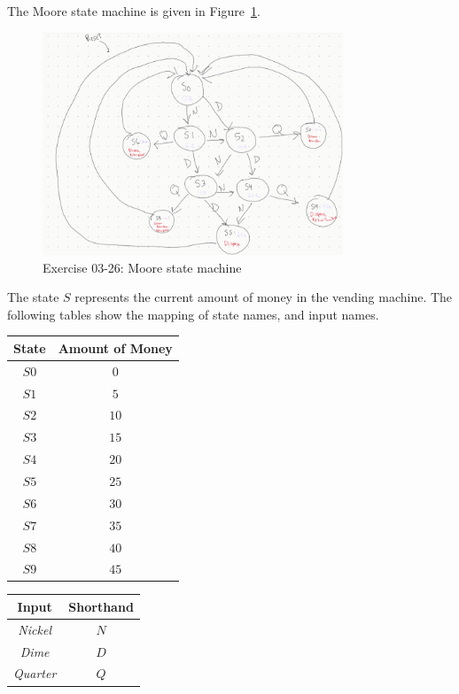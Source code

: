 \documentclass[12pt]{article}
\newenvironment{sol}[1][Solution]{\begin{trivlist}
		\item[\hskip \labelsep {\bfseries #1:}]}{\end{trivlist}}
\begin{document}
\begin{sol}
	The Moore state machine is given in Figure~\ref{03-26-state-machine}.
	\begin{figure}
		\centering
		\includegraphics[width=0.8\textwidth]{03-26-state-machine}
		\caption{Exercise 03-26: Moore state machine}
		\label{03-26-state-machine}
	\end{figure}
	The state $S$ represents the current amount of money in the vending machine.
	The following tables show the mapping of state names, and input names.
	\begin{center}
		\begin{tabular}{c|c}
			State & Amount of Money\\
			\hline
			$S0$ & $0$ \textcent\\
			$S1$ & $5$ \textcent\\
			$S2$ & $10$ \textcent\\
			$S3$ & $15$ \textcent\\
			$S4$ & $20$ \textcent\\
			$S5$ & $25$ \textcent\\
			$S6$ & $30$ \textcent\\
			$S7$ & $35$ \textcent\\
			$S8$ & $40$ \textcent\\
			$S9$ & $45$ \textcent\\
		\end{tabular}
		\quad
		\begin{tabular}{cc}
			Input & Shorthand\\
			\hline
			\emph{Nickel} & $N$\\
			\emph{Dime} & $D$\\
			\emph{Quarter} & $Q$\\
		\end{tabular}

\end{center}
\end{sol}
\end{document}
